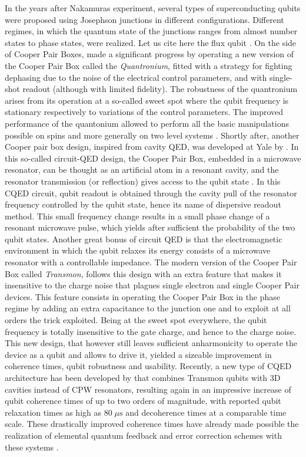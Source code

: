   In the years after Nakamuras experiment, several types of superconducting qubits were proposed using Josephson junctions in different configurations. Different regimes, in which the    quantum state of the junctions  ranges  from almost  number states   to phase states,  were realized.  Let us cite here the flux qubit \citep{mooij_josephson_1999, chiorescu_coherent_2003}.  On the side of Cooper Pair Boxes,  \cite{vion_manipulating_2002} made a significant progress  by operating    a  new   version of the Cooper Pair Box called the {\it Quantronium},  fitted with a strategy for fighting dephasing  due to the noise of the electrical control parameters,  and with single-shot readout (although with limited fidelity). The robustness of the quantronium arises from  its operation at a so-called sweet spot where the qubit  frequency  is stationary respectively to variations of the control parameters. The improved performance of the quantonium allowed to perform all the basic manipulations possible on spins and more generally on  two level systems  \citep{collin_nmr-like_2004}.  Shortly after, another   Cooper pair box design, inspired from cavity QED, was developed at Yale by \cite{wallraff_strong_2004}. In this so-called circuit-QED design, the Cooper Pair Box, embedded in a microwave resonator, can be thought as an artificial atom in a resonant cavity, and the resonator transmission (or reflection)   gives access to the qubit state \citep{blais_cavity_2004}. In this CQED circuit, qubit readout is obtained through the   cavity pull of the resonator frequency controlled by the qubit state, hence its name of dispersive readout method. This small frequency change results in a small phase change of a resonant microwave pulse, which yields after sufficient the probability of the two qubit states.  
Another great bonus of circuit QED is that the electromagnetic environment  in which the qubit  relaxes its energy consists of  a microwave resonator with a controllable impedance.  The modern version of the Cooper Pair Box called {\it Transmon}, follows this design with an extra feature that makes it insensitive to the charge noise that plagues single electron and single Cooper Pair  devices. This feature consists in operating the Cooper Pair Box in the   phase regime by adding an extra capacitance to the   junction one and to  exploit at all orders   the trick exploited.  Being at the sweet spot everywhere,  the qubit frequency is totally insensitive to the gate charge, and hence to the charge noise. This new design, that however still leaves sufficient anharmonicity to operate the device as a qubit and allows to drive it,  yielded a sizeable   improvement in coherence times, qubit robustness and usability. 
Recently, a new type of CQED architecture has been developed by \cite{paik_observation_2011} that combines Transmon qubits with 3D cavities instead of CPW resonators, resulting again in an impressive increase of qubit coherence times of up to two orders of magnitude, with reported qubit relaxation times as high as $80 \; \mu \mathrm{s}$ and decoherence times at a comparable time scale. These drastically improved coherence times have already made possible the realization of elemental quantum feedback and error correction schemes with these systems . 

